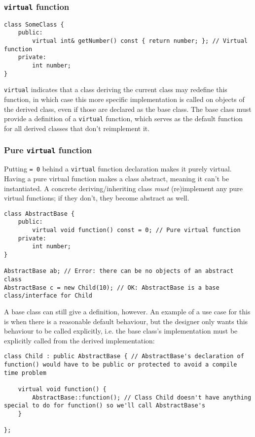 \documentclass[8pt, table, xcdraw]{article}%
\begin{document}
\subsubsection{\lstinline{virtual} function} \label{virtual}

\begin{lstlisting}
class SomeClass {
    public:
        virtual int& getNumber() const { return number; }; // Virtual function
    private:
        int number;
}
\end{lstlisting}

\lstinline{virtual} indicates that a class deriving the current class may redefine this function, in which case this more specific implementation is called on objects of the derived class, even if those are declared as the base class. The base class must provide a definition of a \lstinline{virtual} function, which serves as the default function for all derived classes that don't reimplement it.

\subsubsection{Pure \lstinline{virtual} function} \label{purevirtual}

Putting \lstinline{= 0} behind a \lstinline{virtual} function declaration makes it purely virtual. Having a pure virtual function makes a class abstract, meaning it can't be instantiated. A concrete deriving/inheriting class \emph{must} (re)implement any pure virtual functions; if they don't, they become abstract as well.

\begin{lstlisting}
class AbstractBase {
    public:
        virtual void function() const = 0; // Pure virtual function
    private:
        int number;
}

AbstractBase ab; // Error: there can be no objects of an abstract class
AbstractBase c = new Child(10); // OK: AbstractBase is a base class/interface for Child
\end{lstlisting}

A base class can still give a definition, however. An example of a use case for this is when there is a reasonable default behaviour, but the designer only wants this behaviour to be called explicitly, i.e. the base class's implementation must be explicitly called from the derived implementation:

\begin{lstlisting}
class Child : public AbstractBase { // AbstractBase's declaration of function() would have to be public or protected to avoid a compile time problem

    virtual void function() {
        AbstractBase::function(); // Class Child doesn't have anything special to do for function() so we'll call AbstractBase's
    }

};
\end{lstlisting}
\end{document}

